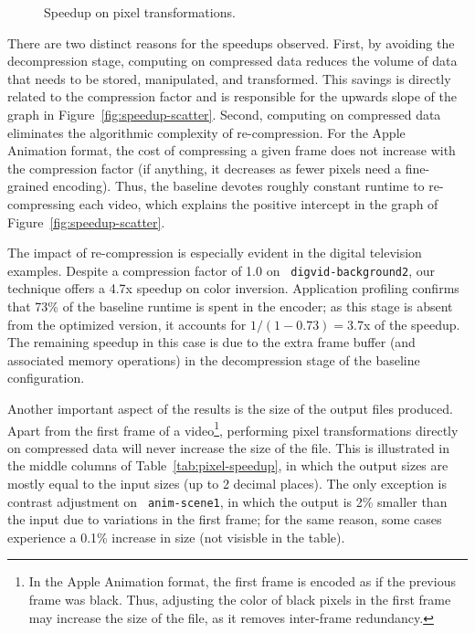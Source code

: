 \begin{figure}[t!]
\centering
{}
\caption[Speedup graph for pixel transformations.]{Speedup on pixel transformations.
\protect\label{fig:pixel-speedup}}
\end{figure}

There are two distinct reasons for the speedups observed.  First, by
avoiding the decompression stage, computing on compressed data reduces
the volume of data that needs to be stored, manipulated, and
transformed.  This savings is directly related to the compression
factor and is responsible for the upwards slope of the graph in
Figure~\ref{fig:speedup-scatter}.  Second, computing on compressed
data eliminates the algorithmic complexity of re-compression.  For the
Apple Animation format, the cost of compressing a given frame does not
increase with the compression factor (if anything, it decreases as
fewer pixels need a fine-grained encoding).  Thus, the baseline
devotes roughly constant runtime to re-compressing each video, which
explains the positive intercept in the graph of
Figure~\ref{fig:speedup-scatter}.

The impact of re-compression is especially evident in the digital
television examples.  Despite a compression factor of 1.0 on {\tt
digvid-background2}, our technique offers a 4.7x speedup on color
inversion.  Application profiling confirms that 
73\% of the baseline runtime is spent in the encoder; as this stage is
absent from the optimized version, it accounts for $1/(1-0.73) = 3.7$x
of the speedup.  The remaining speedup in this case is due to the
extra frame buffer (and associated memory operations) in the
decompression stage of the baseline configuration.
%
%

Another important aspect of the results is the size of the output
files produced.  Apart from the first frame of a video\footnote{In the
Apple Animation format, the first frame is encoded as if the previous
frame was black.  Thus, adjusting the color of black pixels in the
first frame may increase the size of the file, as it removes
inter-frame redundancy.}, performing pixel transformations directly on
compressed data will never increase the size of the file.  This is
illustrated in the middle columns of Table~\ref{tab:pixel-speedup}, in
which the output sizes are mostly equal to the input sizes (up to 2
decimal places).  The only exception is contrast adjustment on {\tt
anim-scene1}, in which the output is 2\% smaller than the input due to
variations in the first frame; for the same reason, some cases
experience a 0.1\% increase in size (not visisble in the table).

